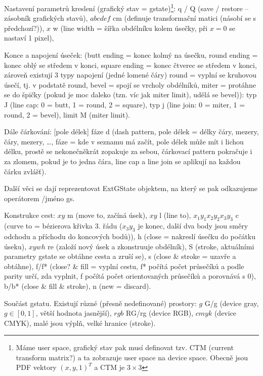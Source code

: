 \documentclass[12pt]{article}					%
\begin{document}
        \begin{definice}[Operátory]
            Nastavení parametrů kreslení (grafický stav = gstate)\footnote{Máme user space, grafický stav pak musí definovat tzv. CTM (current transform matrix?) a ta zobrazuje user space na device space. Obecně jsou PDF vektory $(x, y , 1)^T$ a CTM je $3\times 3$}: q / Q (save / restore -- zásobník grafických stavů), $a b c d e f$ cm (definuje transformační matici (násobí se s předchozí?)), $x$ w (line width = šířka obdélníku kolem úsečky, při $x=0$ se nastaví 1 pixel),

            Konce a napojení úseček: (butt ending = konec kolmý na úsečku, round ending = konec oblý se středem v konci, square ending = konec čtverec se středem v konci, zároveň existují 3 typy napojení (jedné lomené čáry) round = vyplní se kruhovou úsečí, tj. v podstatě round, bevel = spojí se vrcholy obdélníků, miter = protáhne se do špičky (pokud je moc daleko (tzn. víc jak miter limit), udělá se bevel)): typ J (line cap: 0 = butt, 1 = round, 2 = square), typ j (line join: 0 = miter, 1 = round, 2 = bevel), limit M (miter limit).

            Dále čárkování: [pole délek] fáze d (dash pattern, pole délek = délky čáry, mezery, čáry, mezery, …, fáze = kde v seznamu má začít, pole délek může mít i lichou délku, prostě se nekonečněkrát zopakuje za sebou, čárkovací pattern pokračuje i za zlomem, pokud je to jedna čára, line cap a line join se aplikují na každou čárku zvlášť).

            Další věci se dají reprezentovat ExtGState objektem, na který se pak odkazujeme operátorem /jméno gs.

            Konstrukce cest: $x y$ m (move to, začíná úsek), $x y$ l (line to), $x_1 y_1 x_2 y_2 x_3 y_3$ c (curve to = bézierova křivka 3. řádu ($x_3 y_3$ je konec, další dva body jsou směry odchodu a příchodu do koncových bodů)), h (close = nakreslí úsečku do počátku úseku), $x y w h$ re (založí nový úsek a zkonstruuje obdélník), S (stroke, aktuálními parametry gstate se obtáhne cesta a zruší se), s (close \& stroke = uzavře a obtáhne), f/f* (close? \& fill = vyplní cestu, f* počítá počet průsečíků a podle parity určí, zda vyplnit, f počítá počet orientovaných průsečíků a porovnává s 0), b/b* (close \& fill \& stroke), n (new = discard).
        \end{definice}

        \begin{definice}[Barvy]
            Součást gstatu. Existují různé (přesně nedefinované) prostory: $g$ G/g (device gray, $g \in [0, 1]$, větší hodnota jasnější), $r g b$ RG/rg (device RGB), $c m y k$  (device CMYK), malé jsou výplň, velké hranice (stroke).
        \end{definice}
\end{document}
